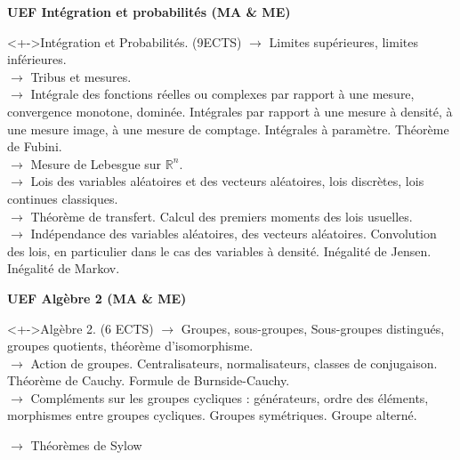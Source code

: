 \documentclass{beamer}
\begin{document}
 
\begin{frame}
{\bf UEF Intégration et probabilités  (MA \& ME)  }
\begin{block}<+->{Intégration et Probabilités.  (9ECTS)} 
$\to$ Limites supérieures, limites inférieures.\\
$\to$ Tribus et  mesures.\\ %
$\to$ Intégrale des fonctions réelles ou complexes par rapport à une mesure, convergence
monotone, dominée. Intégrales par rapport à une mesure à densité, à une mesure image, à
une mesure de comptage. Intégrales à paramètre. Théorème de Fubini.\\
$\to$ Mesure de Lebesgue sur $\mathbb R^n$.\\%
$\to$ Lois des variables aléatoires et des vecteurs aléatoires, lois discrètes,
  lois continues classiques.\\%
$\to$ Théorème de transfert. Calcul des premiers moments des lois usuelles.\\
$\to$ Indépendance des variables aléatoires, des vecteurs aléatoires. Convolution des lois, en
particulier dans le cas des variables à densité. Inégalité de Jensen. Inégalité de Markov.
\end{block}
\end{frame}

\begin{frame}
{\bf UEF Algèbre 2  (MA \& ME) }
\begin{block}<+->{Algèbre 2.   (6 ECTS) } 
$\to$ Groupes, sous-groupes, Sous-groupes distingués, groupes quotients, théorème d'isomorphisme. \\ %
$\to$ Action de groupes.  Centralisateurs, normalisateurs, classes de conjugaison.
Théorème de Cauchy. Formule de Burnside-Cauchy. \\
$\to$ Compléments sur les groupes cycliques : générateurs, ordre des éléments, morphismes
entre groupes cycliques.
Groupes symétriques. Groupe alterné. %

 $\to$ Théorèmes de Sylow

 \end{block}
\end{frame}
\end{document}

